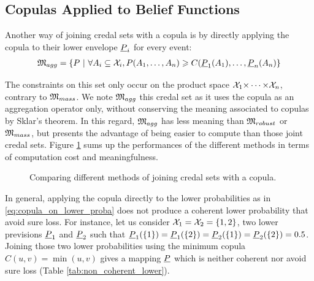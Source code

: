 \subsection{Copulas Applied to Belief Functions}\label{sec:aggregation_method}
Another way of joining credal sets with a copula is by directly applying the copula to their lower envelope ${\underline{P}}_i$ for every event:
\begin{eqnarray}\label{eq:copula_on_lower_proba}
    {\mathfrak{M}}_{agg} = \{P~|~\forall A_i\subseteq{\mathcal{X}}_i, P(A_1,\dots, A_n)\geqslant C({\underline{P}}_1(A_1), \dots, {\underline{P}}_n(A_n)\}
\end{eqnarray}

The constraints on this set only occur on the product space ${\mathcal{X}}_1{\times\dots\times} {\mathcal{X}}_n$, contrary to ${\mathfrak{M}}_{mass}$. We note ${\mathfrak{M}}_{agg}$ this credal set as it uses the copula as an aggregation operator only, without conserving the meaning associated to copulas by Sklar's theorem. In this regard, ${\mathfrak{M}}_{agg}$ has less meaning than ${\mathfrak{M}}_{robust}$ or ${\mathfrak{M}}_{mass}$, but presents the advantage of being easier to compute than those joint credal sets. Figure \ref{fig:meaning_computation} sums up the performances of the different methods in terms of computation cost and meaningfulness.

\begin{figure}[!hb]
    \centering
    \caption{Comparing different methods of joining credal sets with a copula.}
    \label{fig:meaning_computation}
\end{figure}

In general, applying the copula directly to the lower probabilities as in \eqref{eq:copula_on_lower_proba} does not produce a coherent lower probability that avoid sure loss. For instance, let us consider ${\mathcal{X}}_1 = {\mathcal{X}}_2 = \{1, 2\}$, two lower previsions ${\underline{P}}_1$ and ${\underline{P}}_2$ such that ${\underline{P}}_1(\{1\}) = {\underline{P}}_1(\{2\}) = {\underline{P}}_2(\{1\}) = {\underline{P}}_2(\{2\}) = 0.5$. Joining those two lower probabilities using the minimum copula $C(u,v)=\min(u,v)$ gives a mapping ${\underline{P}}$ which is neither coherent nor avoid sure loss (Table \ref{tab:non_coherent_lower}).

